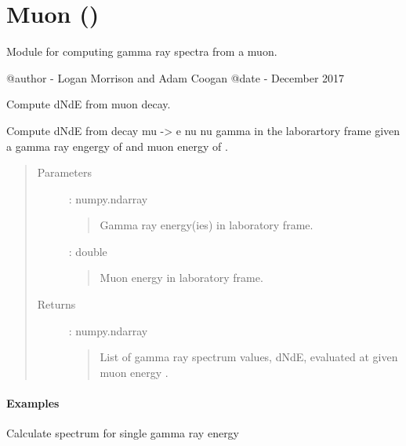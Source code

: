 \documentclass[letterpaper,10pt,english]{sphinxmanual}
\begin{document}
\section{Muon ()}
\label{\detokenize{modules:muon-hazma-muon}}\label{\detokenize{modules:module-hazma.muon}}
Module for computing gamma ray spectra from a muon.

@author - Logan Morrison and Adam Coogan
@date - December 2017

\begin{fulllineitems}
\label{\detokenize{modules:hazma.muon.decay_spectra}}
Compute dNdE from muon decay.

Compute dNdE from decay mu -\textgreater{} e nu nu gamma in the laborartory frame given
a gamma ray engergy of  and muon energy of .
\begin{quote}\begin{description}
\item[{Parameters}] \leavevmode
{} : numpy.ndarray
\begin{quote}

Gamma ray energy(ies) in laboratory frame.
\end{quote}

 : double
\begin{quote}

Muon energy in laboratory frame.
\end{quote}

\item[{Returns}] \leavevmode
{} : numpy.ndarray
\begin{quote}

List of gamma ray spectrum values, dNdE, evaluated at  given
muon energy .
\end{quote}

\end{description}\end{quote}
\paragraph{Examples}

Calculate spectrum for single gamma ray energy


\end{fulllineitems}
\end{document}
